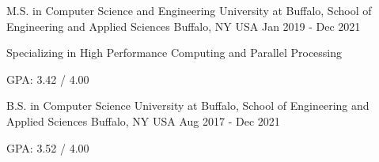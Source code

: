 

\begin{cventries}


  \cventry
    {M.S. in Computer Science and Engineering} %
    {University at Buffalo, School of Engineering and Applied Sciences} %
    {Buffalo, NY USA} %
    {Jan 2019 - Dec 2021} %
    {
      \begin{cvitems} %
        \item {Specializing in High Performance Computing and Parallel Processing}
        \item {GPA: 3.42 / 4.00}
      \end{cvitems}
    }


  \cventry
    {B.S. in Computer Science} %
    {University at Buffalo, School of Engineering and Applied Sciences} %
    {Buffalo, NY USA} %
    {Aug 2017 - Dec 2021} %
    {
      \begin{cvitems} %
        \item {GPA: 3.52 / 4.00}
      \end{cvitems}
    }

\end{cventries}
